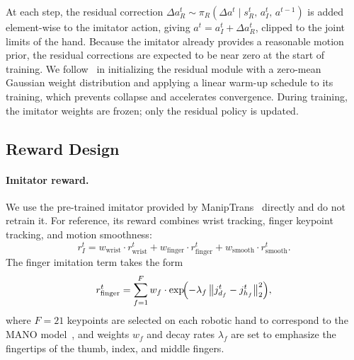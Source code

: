 At each step, the residual correction
$\Delta a^t_R \sim \pi_R\!\left(\Delta a^t \mid s^t_R,\, a^t_I,\, a^{t-1}\right)$
is added element-wise to the imitator action, giving $a^t = a^t_I + \Delta a^t_R$,
clipped to the joint limits of the hand.
Because the imitator already provides a reasonable motion prior, the residual corrections
are expected to be near zero at the start of training.
We follow~\cite{maniptrans} in initializing the residual module with a zero-mean Gaussian
weight distribution and applying a linear warm-up schedule to its training, which prevents
collapse and accelerates convergence.
During training, the imitator weights are frozen; only the residual policy is updated.

 
\subsection{Reward Design}
\label{sec:reward}
 
\paragraph{Imitator reward.}
We use the pre-trained imitator provided by ManipTrans~\cite{maniptrans} directly and do
not retrain it.
For reference, its reward combines wrist tracking, finger keypoint tracking, and motion
smoothness:
\begin{equation}
    r^t_I =
    w_\mathrm{wrist} \cdot r^t_\mathrm{wrist} +
    w_\mathrm{finger} \cdot r^t_\mathrm{finger} +
    w_\mathrm{smooth} \cdot r^t_\mathrm{smooth}.
\end{equation}
The finger imitation term takes the form
\begin{equation}
    r^t_\mathrm{finger} =
    \sum_{f=1}^{F}
    w_f \cdot \exp\!\Bigl(-\lambda_f \,\bigl\|j^t_{d_f} - j^t_{h_f}\bigr\|_2^2\Bigr),
\end{equation}
where $F = 21$ keypoints are selected on each robotic hand to correspond to the MANO
model~\cite{mano}, and weights $w_f$ and decay rates $\lambda_f$ are set to emphasize the
fingertips of the thumb, index, and middle fingers.
 
